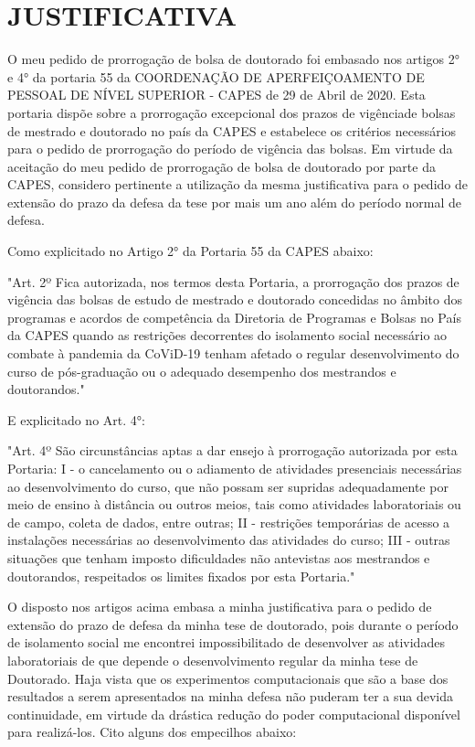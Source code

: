 \chapter{JUSTIFICATIVA}
\label{justificativa}

O meu pedido de prorrogação de bolsa de doutorado foi embasado nos artigos 2° e 4° da portaria 55
da COORDENAÇÃO DE APERFEIÇOAMENTO DE PESSOAL DE NÍVEL SUPERIOR - CAPES de 29 de Abril de 2020.
Esta portaria dispõe sobre a prorrogação excepcional
dos prazos de vigênciade bolsas de mestrado e doutorado no país da CAPES
e estabelece os critérios necessários para o pedido de prorrogação do período de vigência das bolsas.
Em virtude da aceitação do meu pedido de prorrogação de bolsa de doutorado por parte da CAPES,
considero pertinente a utilização da mesma justificativa para o pedido de extensão do prazo da defesa da tese
por mais um ano além do período normal de defesa.

Como explicitado no Artigo 2° da Portaria 55 da CAPES abaixo:

"Art. 2º Fica autorizada, nos termos desta Portaria, a prorrogação dos prazos de vigência das bolsas de estudo de mestrado e doutorado concedidas no âmbito dos programas e acordos de competência da Diretoria de Programas e Bolsas no País da CAPES quando as restrições decorrentes do isolamento social necessário ao combate à pandemia da CoViD-19 tenham afetado o regular desenvolvimento do curso de pós-graduação ou o adequado desempenho dos mestrandos e doutorandos."

E explicitado no Art. 4°:

"Art. 4º São circunstâncias aptas a dar ensejo à prorrogação autorizada por esta Portaria:
I - o cancelamento ou o adiamento de atividades presenciais necessárias ao desenvolvimento do curso, que não possam ser supridas adequadamente por meio de ensino à distância ou outros meios, tais como atividades laboratoriais ou de campo, coleta de dados, entre outras; II - restrições temporárias de acesso a instalações necessárias ao desenvolvimento das atividades do curso;
III - outras situações que tenham imposto dificuldades não antevistas aos mestrandos e doutorandos, respeitados os limites fixados por esta Portaria."

O disposto nos artigos acima embasa a minha justificativa para o pedido de extensão do prazo de defesa da minha
tese de doutorado, pois durante o período de isolamento social me encontrei impossibilitado de desenvolver as atividades laboratoriais de que depende o desenvolvimento regular da minha tese de Doutorado. Haja vista que os experimentos computacionais que são a base dos resultados a serem apresentados na minha defesa não puderam ter a sua devida continuidade, em virtude da drástica redução do poder computacional disponível para realizá-los. Cito alguns dos empecilhos abaixo:

